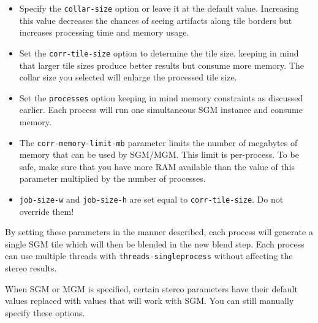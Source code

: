 \begin{itemize}
\item Specify the \texttt{collar-size} option or leave it at the default value.  Increasing this value decreases
the chances of seeing artifacts along tile borders but increases processing time and memory usage.
\item Set the \texttt{corr-tile-size} option to determine the tile size, keeping in mind that larger tile sizes
produce better results but consume more memory.  The collar size you selected will enlarge the processed tile size.
\item Set the \texttt{processes} option keeping in mind memory constraints as discussed earlier.  Each process will 
run one simultaneous SGM instance and consume memory.
\item The \texttt{corr-memory-limit-mb} parameter limits the number of megabytes of memory that can be used by SGM/MGM.
This limit is per-process. To be safe, make sure that you have more RAM available than the value of this parameter
multiplied by the number of processes.
\item \texttt{job-size-w} and \texttt{job-size-h} are set equal to \texttt{corr-tile-size}.  Do not override them!
\end{itemize}

By setting these parameters in the manner described, each process will generate a single SGM tile which will then be
blended in the new blend step.  Each process can use multiple threads with \texttt{threads-singleprocess} without
affecting the stereo results.

When SGM or MGM is specified, certain stereo parameters have their default values
replaced with values that will work with SGM.  You can still manually specify these
options.

